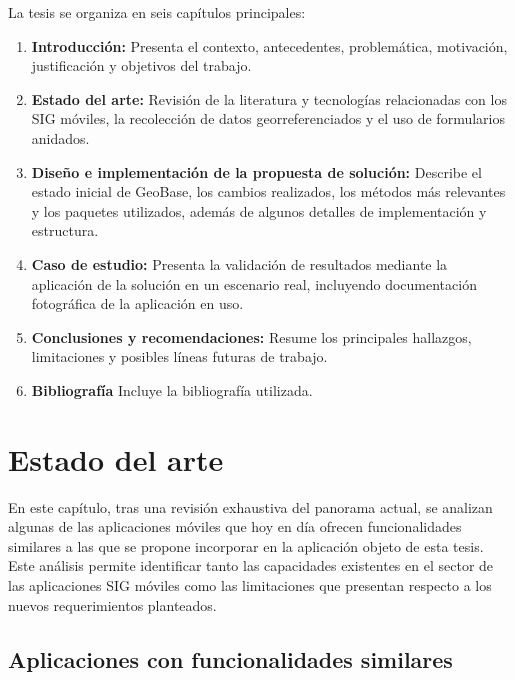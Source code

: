 \documentclass[12pt, a4paper]{book}
\providecommand{\tightlist}{%
  \setlength{\itemsep}{0pt}\setlength{\parskip}{0pt}}
\begin{document}
La tesis se organiza en seis capítulos principales:

\begin{enumerate}
\def\labelenumi{\arabic{enumi}.}
\tightlist
\item
  \textbf{Introducción:} Presenta el contexto, antecedentes,
  problemática, motivación, justificación y objetivos del trabajo.
\item
  \textbf{Estado del arte:} Revisión de la literatura y tecnologías
  relacionadas con los SIG móviles, la recolección de datos
  georreferenciados y el uso de formularios anidados.
\item
  \textbf{Diseño e implementación de la propuesta de solución:} Describe el estado inicial de GeoBase, los cambios realizados, los métodos más relevantes y los paquetes utilizados, además de algunos detalles de implementación y estructura.
\item
  \textbf{Caso de estudio:} Presenta la validación de resultados mediante la aplicación de la solución en un escenario real, incluyendo documentación fotográfica de la aplicación en uso.
\item
  \textbf{Conclusiones y recomendaciones:} Resume los principales
  hallazgos, limitaciones y posibles líneas futuras de trabajo.
\item
  \textbf{Bibliografía} Incluye la bibliografía utilizada.
\end{enumerate}















\chapter{Estado del arte}\label{estadodelarte}

En este capítulo, tras una revisión exhaustiva del panorama actual, se analizan algunas de las aplicaciones móviles que hoy en día ofrecen funcionalidades similares a las que se propone incorporar en la aplicación objeto de esta tesis. Este análisis permite identificar tanto las capacidades existentes en el sector de las aplicaciones SIG móviles como las limitaciones que presentan respecto a los nuevos requerimientos planteados.

\section{Aplicaciones con funcionalidades similares}
\end{document}
